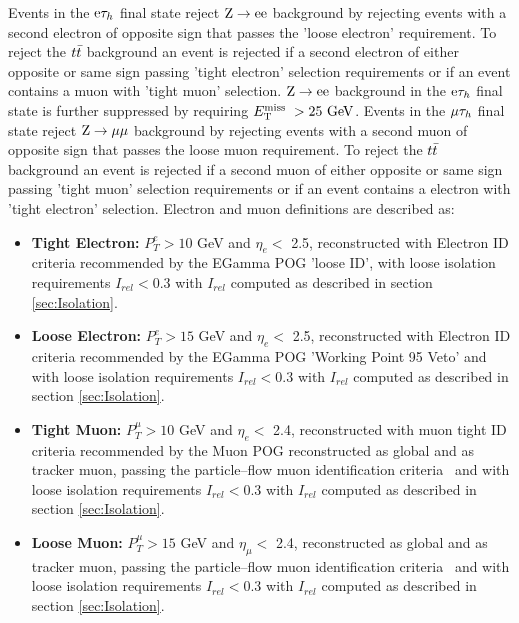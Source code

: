 Events in the $\mathrm{e}\mathrm{\tau}_h$ final state reject $\mathrm{Z}\to\mathrm{e}\mathrm{e}$ background by rejecting events with
a second electron of opposite sign that passes the 'loose electron' requirement.
To reject the $t\bar{t}$ background an event is rejected if a second electron of either opposite or same sign
passing 'tight electron' selection requirements or if an event contains a muon with 'tight muon' selection.
$\mathrm{Z}\to\mathrm{e}\mathrm{e}$ background in the $\mathrm{e}\mathrm{\tau}_h$ final state is further suppressed by requiring $E_\mathrm{T}^{\mathrm{miss}}\; > 25~\mathrm{GeV}$.
Events in the $\mathrm{\mu}\mathrm{\tau}_h$ final state reject $\mathrm{Z}\to\mathrm{\mu}\mathrm{\mu}$ background by rejecting events with
a second muon of opposite sign that passes the loose muon requirement.
To reject the $t\bar{t}$ background an event is rejected if a second muon of either opposite or same sign
passing 'tight muon' selection requirements or if an event contains a electron with 'tight electron' selection.
Electron and muon definitions are described as:
\begin{itemize}
\item {\bf Tight Electron:} $P_{T}^{e}>10$ GeV and $\eta_{e}<$ 2.5, reconstructed with Electron ID
criteria recommended by the EGamma POG \cite{cutBasedElectronId}
'loose ID', with loose isolation requirements $I_{rel}<0.3$ with $I_{rel}$ computed as described
in section \ref{sec:Isolation}.
\item {\bf Loose Electron:} $P_{T}^{e}>15$ GeV and $\eta_{e}<$ 2.5, reconstructed with Electron ID
criteria recommended by the EGamma POG \cite{cutBasedElectronId} 
'Working Point 95 Veto' and with loose isolation requirements $I_{rel}<0.3$ with $I_{rel}$ computed as described
in section \ref{sec:Isolation}.
\item {\bf Tight Muon:} $P_{T}^{\mu}>10$ GeV and $\eta_{e}<$ 2.4, reconstructed with muon tight ID
criteria recommended by the Muon POG 
reconstructed as global and as tracker muon,
  passing the particle--flow muon identification criteria~\cite{pfMuonID}
and with loose isolation requirements $I_{rel}<0.3$ with $I_{rel}$ computed as described
in section \ref{sec:Isolation}.
\item {\bf Loose Muon:} $P_{T}^{\mu}>15$ GeV and $\eta_{\mu}<$ 2.4, 
reconstructed as global and as tracker muon,
  passing the particle--flow muon identification criteria~\cite{pfMuonID}
 and with loose isolation requirements $I_{rel}<0.3$ with $I_{rel}$ computed as described
in section \ref{sec:Isolation}.
\end{itemize}


